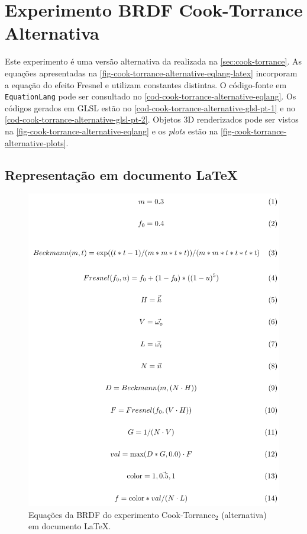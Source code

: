 
\section{Experimento BRDF Cook-Torrance Alternativa}
\label{section-experiment-cook-torrance-alternative}

Este experimento é uma versão alternativa da realizada na \autoref{sec:cook-torrance}. As equações apresentadas na \autoref{fig-cook-torrance-alternative-eqlang-latex} incorporam a equação do efeito Fresnel e utilizam constantes distintas. O código-fonte em \texttt{EquationLang} pode ser consultado no \autoref{cod-cook-torrance-alternative-eqlang}. Os códigos gerados em GLSL estão no \autoref{cod-cook-torrance-alternative-glsl-pt-1} e no \autoref{cod-cook-torrance-alternative-glsl-pt-2}. Objetos 3D renderizados pode ser vistos na \autoref{fig-cook-torrance-alternative-eqlang} e os \textit{plots} estão na \autoref{fig-cook-torrance-alternative-plots}.


\subsection{Representação em documento \LaTeX{}}
\begin{figure}[H]
    \caption{\label{fig-cook-torrance-alternative-eqlang-latex}
    \small Equações da BRDF do experimento Cook-Torrance$_2$ (alternativa) em documento \LaTeX{}.}
    \begin{center}
        \includegraphics[scale=0.92]{./Imagens/brdfs/cook-torrance-alternative.pdf}
    \end{center}
\end{figure}

